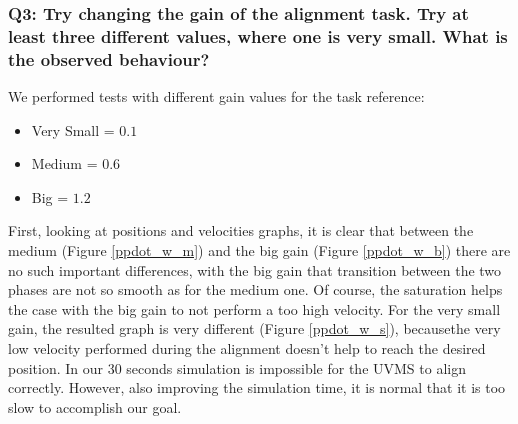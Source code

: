 \documentclass{article}
\begin{document}
\subsubsection{Q3: Try changing the gain of the alignment task. Try at least three different values, where one is very small. What is the observed behaviour?} 
We performed tests with different gain values for the task reference:
\begin{itemize}
	\item Very Small = $0.1$
	\item Medium = $0.6$
	\item Big = $1.2$
\end{itemize}
First, looking at positions and velocities graphs, it is clear that between the medium (Figure \ref{ppdot_w_m}) and the big gain (Figure \ref{ppdot_w_b}) there are no such important differences, with the big gain that transition between the two phases are not so smooth as for the medium one. Of course, the saturation helps the case with the big gain to not perform a too high velocity. 
For the very small gain, the resulted graph is very different (Figure \ref{ppdot_w_s}), becausethe very low velocity performed during the alignment doesn't help to reach the desired position. In our 30 seconds simulation is impossible for the UVMS to align correctly. However, also improving the simulation time, it is normal that it is too slow to accomplish our goal.
\end{document}
